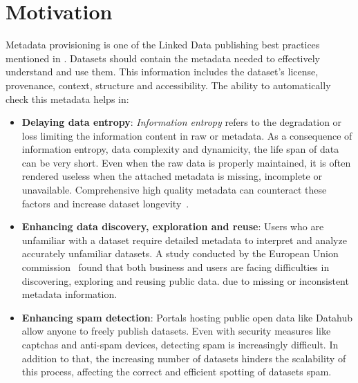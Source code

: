 \documentclass[runningheads,a4paper]{llncs}
\begin{document}
\section{Motivation}
\label{sec:motivation}
Metadata provisioning is one of the Linked Data publishing best practices mentioned in \cite{Bizer:2011:EWG:2075914.2075915}. Datasets should contain the metadata needed to effectively understand and use them. This information includes the dataset's license, provenance, context, structure and accessibility. The ability to automatically check this metadata helps in:
\begin{itemize}
  \item \textbf{Delaying data entropy}: \textit{Information entropy} refers to the degradation or loss limiting the information content in raw or metadata. As a consequence of information entropy, data complexity and dynamicity, the life span of data can be very short. Even when the raw data is properly maintained, it is often rendered useless when the attached metadata is missing, incomplete or unavailable. Comprehensive high quality metadata can counteract these factors and increase dataset longevity~\cite{GTOS}.
  \item \textbf{Enhancing data discovery, exploration and reuse}: Users who are unfamiliar with a dataset require detailed metadata to interpret and analyze accurately unfamiliar datasets. A study conducted by the European Union commission~\cite{Graham:11:} found that both business and users are facing difficulties in discovering, exploring and reusing public data. due to missing or inconsistent metadata information.
  \item \textbf{Enhancing spam detection}: Portals hosting public open data like Datahub allow anyone to freely publish datasets. Even with security measures like captchas and anti-spam devices, detecting spam is increasingly difficult. In addition to that, the increasing number of datasets hinders the scalability of this process, affecting the correct and efficient spotting of datasets spam.
\end{itemize}

\end{document}
